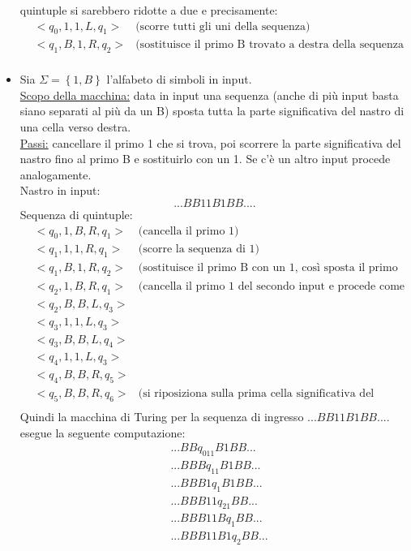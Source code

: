 \begin{itemize}
\begin{oss}
quintuple si sarebbero ridotte a due e precisamente:
\begin{eqnarray*}
&<q_0,1,1,L,q_1>&\mbox{(scorre tutti gli uni della sequenza)}\\
&<q_1,B,1,R,q_2>&\mbox{(sostituisce il primo B trovato a destra della sequenza con un 1)}\\
\end{eqnarray*}
\end{oss}
\item Sia $\Sigma=\left\{1,B\right\}$ l'alfabeto di simboli in
  input.\\\underline{Scopo della macchina:} data in input una sequenza
  (anche di pi\`u input basta siano separati al pi\`u da un B) sposta
  tutta la parte significativa del nastro di una cella verso
  destra.\\ \underline{Passi:} cancellare il primo 1 che si trova, poi
  scorrere la parte significativa del nastro fino al primo B e
  sostituirlo con un 1. Se c'\`e un altro input procede
  analogamente.\\ Nastro in input:$$...BB11B1BB....$$ Sequenza di
  quintuple:
\begin{eqnarray*}
&<q_0,1,B,R,q_1>&\mbox{(cancella il primo 1)}\\
&<q_1,1,1,R,q_1>&\mbox{(scorre la sequenza di 1)}\\
&<q_1,B,1,R,q_2>&\mbox{(sostituisce il primo B con un 1, cos\`i sposta il primo blocco)}\\
&<q_2,1,B,R,q_1>&\mbox{(cancella il primo 1 del secondo input e procede come prima)}\\
&<q_2,B,B,L,q_3>&\\
&<q_3,1,1,L,q_3>&\\
&<q_3,B,B,L,q_4>&\\
&<q_4,1,1,L,q_3>&\\
&<q_4,B,B,R,q_5>&\\
&<q_5,B,B,R,q_6>&\mbox{(si riposiziona sulla prima cella significativa del nastro)}\\
\end{eqnarray*}
Quindi la macchina di Turing per la sequenza di ingresso $...BB11B1BB....$ esegue la seguente computazione:
\begin{eqnarray*}
&...BBq_011B1BB...\\
&...BBBq_11B1BB...\\
&...BBB1q_1B1BB...\\
&...BBB11q_21BB...\\
&...BBB11Bq_1BB...\\
&...BBB11B1q_2BB...\\

\end{eqnarray*}
\end{itemize}
